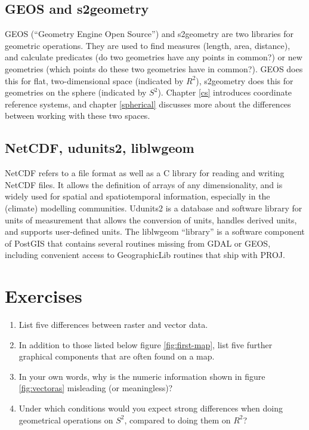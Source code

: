 \documentclass[]{book}
\providecommand{\tightlist}{%
  \setlength{\itemsep}{0pt}\setlength{\parskip}{0pt}}
\begin{document}
\hypertarget{geos-and-s2geometry}{%
\subsection{GEOS and s2geometry}\label{geos-and-s2geometry}}

GEOS (``Geometry Engine Open Source'') and s2geometry are two libraries
for geometric operations. They are used to find measures (length,
area, distance), and calculate predicates (do two geometries have
any points in common?) or new geometries (which points do these two
geometries have in common?). GEOS does this for flat, two-dimensional
space (indicated by \(R^2\)), s2geometry does this for geometries on
the sphere (indicated by \(S^2\)). Chapter \ref{cs} introduces
coordinate reference systems, and chapter \ref{spherical} discusses
more about the differences between working with these two spaces.

\hypertarget{netcdf-udunits2-liblwgeom}{%
\subsection{NetCDF, udunits2, liblwgeom}\label{netcdf-udunits2-liblwgeom}}

NetCDF \citep{netcdf} refers to a file format as well as a C library
for reading and writing NetCDF files. It allows the definition of
arrays of any dimensionality, and is widely used for spatial and
spatiotemporal information, especially in the (climate) modelling
communities. Udunits2 \citep{udunits2, R-units} is a database and software
library for units of measurement that allows the conversion of
units, handles derived units, and supports user-defined units. The
liblwgeom ``library'' is a software component of PostGIS \citep{postgis}
that contains several routines missing from GDAL or GEOS, including
convenient access to GeographicLib routines \citep{karney2013algorithms}
that ship with PROJ.

\hypertarget{exercises}{%
\section{Exercises}\label{exercises}}

\begin{enumerate}
\def\labelenumi{\arabic{enumi}.}
\tightlist
\item
  List five differences between raster and vector data.
\item
  In addition to those listed below figure \ref{fig:first-map}, list five further graphical components that are often found on a map.
\item
  In your own words, why is the numeric information shown in figure \ref{fig:vectoras} misleading (or meaningless)?
\item
  Under which conditions would you expect strong differences when doing geometrical operations on \(S^2\), compared to doing them on \(R^2\)?
\end{enumerate}
\end{document}
